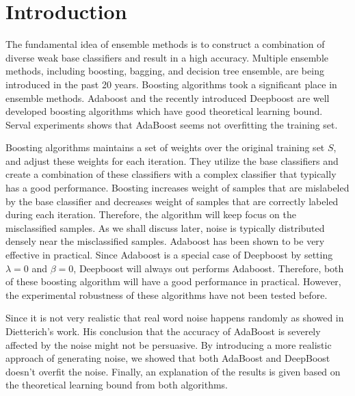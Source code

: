 \section{Introduction}
The fundamental idea of ensemble methods is to construct a combination of diverse weak base classifiers and result in a high accuracy.
Multiple ensemble methods, including boosting\cite{freund1996experiments}, bagging\cite{breiman1996bagging}, and decision tree ensemble\cite{banfield2007comparison}, are being introduced in the past 20 years.
Boosting algorithms took a significant place in ensemble methods. Adaboost\cite{freund1997decision} and the recently introduced Deepboost\cite{cortes2014deep}
are well developed boosting algorithms which have good theoretical learning bound. Serval experiments shows that AdaBoost seems not overfitting the training set.

Boosting algorithms maintains a set of weights over the original training set $S$, and adjust these weights for each iteration.
They utilize the base classifiers and create a combination of these classifiers with a complex classifier that typically has a good performance.
Boosting increases weight of samples that are mislabeled by the base classifier and decreases weight of samples that are correctly labeled during each iteration.
Therefore, the algorithm will keep focus on the misclassified samples.
As we shall discuss later, noise is typically distributed densely near the misclassified samples.
Adaboost has been shown to be very effective in practical\cite{quinlan1996bagging}.
Since Adaboost is a special case of Deepboost by setting $\lambda=0$ and $\beta=0$, Deepboost will always out performs Adaboost.
Therefore, both of these boosting algorithm will have a good performance in practical.
However, the experimental robustness of these algorithms have not been tested before.

Since it is not very realistic that real word noise happens randomly as showed in Dietterich's work\cite{dietterich2000experimental}. His conclusion that the accuracy of AdaBoost is severely affected by the noise might not be persuasive.
By introducing a more realistic approach of generating noise, we showed that both AdaBoost and DeepBoost doesn't overfit the noise. Finally, an explanation of the results is given based on the theoretical learning bound from both algorithms.
